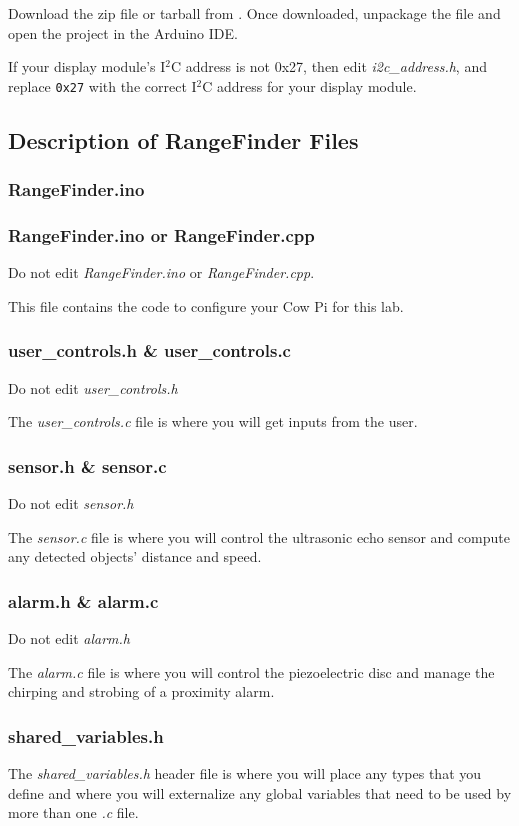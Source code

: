 Download the zip file or tarball from \filesource.
Once downloaded, unpackage the file and open the project in the Arduino IDE\@.

If your display module's I$^2$C address is not 0x27, then edit \textit{i2c\_address.h}, and replace \lstinline{0x27} with the correct I$^2$C address for your display module.

\subsection{Description of RangeFinder Files}

\subsubsection{RangeFinder.ino}
\subsubsection{RangeFinder.ino or RangeFinder.cpp}

Do not edit \textit{RangeFinder.ino} or \textit{RangeFinder.cpp}.

This file contains the code to configure your Cow Pi for this lab.

\subsubsection{user\_controls.h \& user\_controls.c}

Do not edit \textit{user\_controls.h}

The \textit{user\_controls.c} file is where you will get inputs from the user.

\subsubsection{sensor.h \& sensor.c}

Do not edit \textit{sensor.h}

The \textit{sensor.c} file is where you will control the ultrasonic echo sensor and compute any detected objects' distance and speed.

\subsubsection{alarm.h \& alarm.c}

Do not edit \textit{alarm.h}

The \textit{alarm.c} file is where you will control the piezoelectric disc and manage the chirping and strobing of a proximity alarm.

\subsubsection{shared\_variables.h}

The \textit{shared\_variables.h} header file is where you will place any types that you define and where you will externalize any global variables that need to be used by more than one \textit{.c} file.
